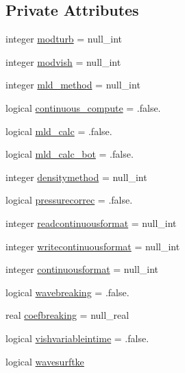 \subsection*{Private Attributes}
\begin{DoxyCompactItemize}
\item 
integer \mbox{\hyperlink{structmoduleturbulence_1_1t__turboptions_a1a007fe608b5ac73e8d67a72aaf6ccce}{modturb}} = null\+\_\+int
\item 
integer \mbox{\hyperlink{structmoduleturbulence_1_1t__turboptions_a130cdb1984dba13716ff4e863e480d7e}{modvish}} = null\+\_\+int
\item 
integer \mbox{\hyperlink{structmoduleturbulence_1_1t__turboptions_adef5d5d8cd21c18bf0f59346b0a7296f}{mld\+\_\+method}} = null\+\_\+int
\item 
logical \mbox{\hyperlink{structmoduleturbulence_1_1t__turboptions_a4e4fa8d3374ee9f89b92d78aa001c8d6}{continuous\+\_\+compute}} = .false.
\item 
logical \mbox{\hyperlink{structmoduleturbulence_1_1t__turboptions_ac2557a89bafef798041236ed316674b4}{mld\+\_\+calc}} = .false.
\item 
logical \mbox{\hyperlink{structmoduleturbulence_1_1t__turboptions_a9e106b7c780283cafa055352575993b2}{mld\+\_\+calc\+\_\+bot}} = .false.
\item 
integer \mbox{\hyperlink{structmoduleturbulence_1_1t__turboptions_a7f86693af8c8b20b34846a937449a8b6}{densitymethod}} = null\+\_\+int
\item 
logical \mbox{\hyperlink{structmoduleturbulence_1_1t__turboptions_a872ac215c3b6ac075367e42d0a0aa8c6}{pressurecorrec}} = .false.
\item 
integer \mbox{\hyperlink{structmoduleturbulence_1_1t__turboptions_ae592420f9b5030d1c7592fb6de2bb1ae}{readcontinuousformat}} = null\+\_\+int
\item 
integer \mbox{\hyperlink{structmoduleturbulence_1_1t__turboptions_a826e75510c3aafb5b0a760d149aa6fa8}{writecontinuousformat}} = null\+\_\+int
\item 
integer \mbox{\hyperlink{structmoduleturbulence_1_1t__turboptions_a43abedfb34d693657c28b8c55a61d3ea}{continuousformat}} = null\+\_\+int
\item 
logical \mbox{\hyperlink{structmoduleturbulence_1_1t__turboptions_a9eed706aeba676782bea0c0f9a71ea72}{wavebreaking}} = .false.
\item 
real \mbox{\hyperlink{structmoduleturbulence_1_1t__turboptions_acacdd59b779ad99f27e393a2302f0159}{coefbreaking}} = null\+\_\+real
\item 
logical \mbox{\hyperlink{structmoduleturbulence_1_1t__turboptions_a70d04e42f4dccdf3d988b23fad34a665}{vishvariableintime}} = .false.
\item 
logical \mbox{\hyperlink{structmoduleturbulence_1_1t__turboptions_a88b3982c9a8c1e2db1234e64b87b290c}{wavesurftke}}
\end{DoxyCompactItemize}


